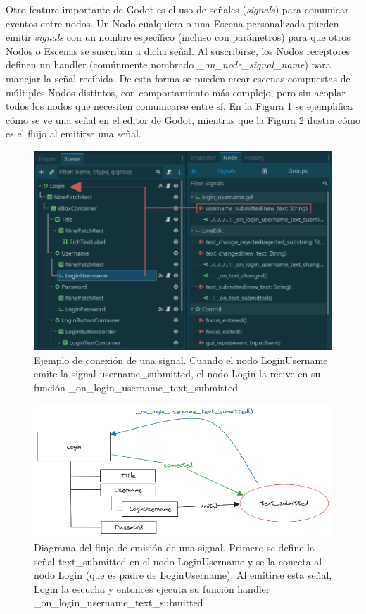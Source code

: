 Otro feature importante de Godot es el uso de señales (\textit{signals}) para comunicar eventos entre nodos.
Un Nodo cualquiera o una Escena personalizada pueden emitir \textit{signals} con un nombre específico 
(incluso con parámetros) para que otros Nodos o Escenas se suscriban a dicha señal. Al suscribirse, los 
Nodos receptores definen un handler (comúnmente nombrado \textit{\_on\_node\_signal\_name}) para manejar 
la señal recibida. De esta forma se pueden crear escenas compuestas de múltiples Nodos distintos, con 
comportamiento más complejo, pero sin acoplar todos los nodos que necesiten comunicarse entre sí. En la
Figura \ref{fig:signals-editor} se ejemplifica cómo se ve una señal en el editor de Godot, mientras que
la Figura \ref{fig:signals-diagram} ilustra cómo es el flujo al emitirse una señal.

\begin{figure}[htbp]
    \centering
    \includegraphics[width=1.0\textwidth]{../assets/godot-signals.png}
    \caption{Ejemplo de conexión de una signal. Cuando el nodo LoginUsername emite la signal
            username\_submitted, el nodo Login la recive en su función \_on\_login\_username\_text\_submitted}
    \label{fig:signals-editor}
\end{figure}

\begin{figure}[htbp]
    \centering
    \includegraphics[width=1.0\textwidth]{../assets/godot-signals-diagram.png}
    \caption{Diagrama del flujo de emisión de una signal. Primero se define la señal text\_submitted
            en el nodo LoginUsername y se la conecta al nodo Login (que es padre de LoginUsername).
            Al emitirse esta señal, Login la escucha y entonces ejecuta su función handler
            \_on\_login\_username\_text\_submitted}
    \label{fig:signals-diagram}
\end{figure}

